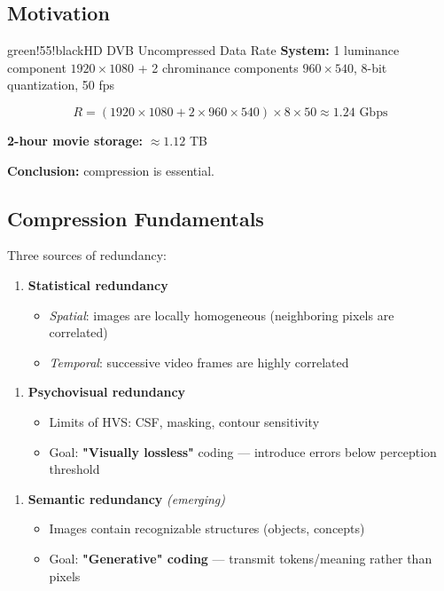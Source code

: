 \subsection{Motivation}

\begin{calloutbox}{green!55!black}{HD DVB Uncompressed Data Rate}
\textbf{System:} 1 luminance component $1920\times1080$ + 2 chrominance components $960\times540$, 8-bit quantization, 50 fps

\[
R = (1920\times1080 + 2\times960\times540)\times8\times50 \approx 1.24 \text{ Gbps}
\]

\textbf{2-hour movie storage:} $\approx 1.12$ TB

\textbf{Conclusion:} compression is essential.
\end{calloutbox}

\subsection{Compression Fundamentals}

Three sources of redundancy:

\begin{enumerate}
\item \textbf{Statistical redundancy}
\begin{itemize}
\item \textit{Spatial}: images are locally homogeneous (neighboring pixels are correlated)
\item \textit{Temporal}: successive video frames are highly correlated
\end{itemize}
\end{enumerate}

\begin{enumerate}
\item \textbf{Psychovisual redundancy}
\begin{itemize}
\item Limits of HVS: CSF, masking, contour sensitivity
\item Goal: \textbf{"Visually lossless"} coding — introduce errors below perception threshold
\end{itemize}
\end{enumerate}

\begin{enumerate}
\item \textbf{Semantic redundancy} \textit{(emerging)}
\begin{itemize}
\item Images contain recognizable structures (objects, concepts)
\item Goal: \textbf{"Generative" coding} — transmit tokens/meaning rather than pixels
\end{itemize}
\end{enumerate}

